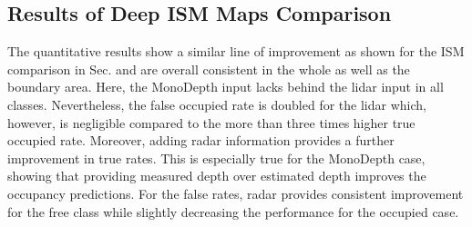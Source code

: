 \subsection{Results of Deep ISM Maps Comparison}
\label{subsec:results_analyze_deep_ism_maps_diff_sensors}
The quantitative results show a similar line of improvement as shown for the ISM comparison in Sec.  and are overall consistent in the whole as well as the boundary area. Here, the MonoDepth input lacks behind the lidar input in all classes. Nevertheless, the false occupied rate is doubled for the lidar which, however, is negligible compared to the more than three times higher true occupied rate. Moreover, adding radar information provides a further improvement in true rates. This is especially true for the MonoDepth case, showing that providing measured depth over estimated depth improves the occupancy predictions. For the false rates, radar provides consistent improvement for the free class while slightly decreasing the performance for the occupied case.
 
